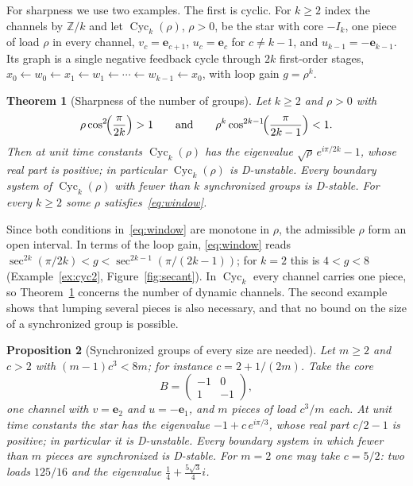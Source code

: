 \documentclass[11pt,a4paper]{article}
\theoremstyle{plain}
\newtheorem{theorem}{Theorem}[section]
\newtheorem{proposition}[theorem]{Proposition}
\theoremstyle{definition}
\theoremstyle{remark}
\newcommand{\Cyc}{\operatorname{Cyc}}
\newcommand{\be}{\mathbf{e}}
\begin{document}
For sharpness we use two examples. The first is cyclic. For $k\ge2$ index the channels by
$\mathbb{Z}/k$ and let $\Cyc_k(\rho)$, $\rho>0$, be the star with core $-I_k$, one piece of
load $\rho$ in every channel, $v_c=\be_{c+1}$, $u_c=\be_c$ for $c\ne k-1$, and
$u_{k-1}=-\be_{k-1}$. Its graph is a single negative feedback cycle through $2k$
first-order stages, $x_0\leftarrow w_0\leftarrow x_1\leftarrow w_1\leftarrow\cdots\leftarrow
w_{k-1}\leftarrow x_0$, with loop gain $g=\rho^k$.

\begin{theorem}[Sharpness of the number of groups]\label{thm:sharpness}
Let $k\ge2$ and $\rho>0$ with
\begin{equation}\label{eq:window}
  \rho\cos^2\!\Bigl(\frac{\pi}{2k}\Bigr)>1
  \qquad\text{and}\qquad
  \rho^k\cos^{2k-1}\!\Bigl(\frac{\pi}{2k-1}\Bigr)<1 .
\end{equation}
Then at unit time constants $\Cyc_k(\rho)$ has the eigenvalue $\sqrt\rho\,e^{i\pi/2k}-1$,
whose real part is positive; in particular $\Cyc_k(\rho)$ is D-unstable. Every boundary
system of $\Cyc_k(\rho)$ with fewer than $k$ synchronized groups is D-stable. For every
$k\ge2$ some $\rho$ satisfies~\eqref{eq:window}.
\end{theorem}

Since both conditions in~\eqref{eq:window} are monotone in $\rho$, the admissible $\rho$
form an open interval. In terms of the loop gain, \eqref{eq:window} reads
$\sec^{2k}(\pi/2k)<g<\sec^{2k-1}(\pi/(2k-1))$; for $k=2$ this is $4<g<8$
(Example~\ref{ex:cyc2}, Figure~\ref{fig:secant}). In $\Cyc_k$ every channel carries one
piece, so Theorem~\ref{thm:sharpness} concerns the number of dynamic channels. The second
example shows that lumping several pieces is also necessary, and that no bound on the size
of a synchronized group is possible.

\begin{proposition}[Synchronized groups of every size are needed]\label{prop:lumping}
Let $m\ge2$ and $c>2$ with $(m-1)c^3<8m$; for instance $c=2+1/(2m)$. Take the core
\[
  B=\begin{pmatrix}-1&0\\1&-1\end{pmatrix},
\]
one channel with $v=\be_2$ and $u=-\be_1$, and $m$ pieces of load $c^3/m$ each. At unit time
constants the star has the eigenvalue $-1+c\,e^{i\pi/3}$, whose real part $c/2-1$ is
positive; in particular it is D-unstable. Every boundary system in which fewer than $m$
pieces are synchronized is D-stable. For $m=2$ one may take $c=5/2$: two loads $125/16$ and
the eigenvalue $\tfrac14+\tfrac{5\sqrt3}{4}i$.
\end{proposition}
\end{document}
